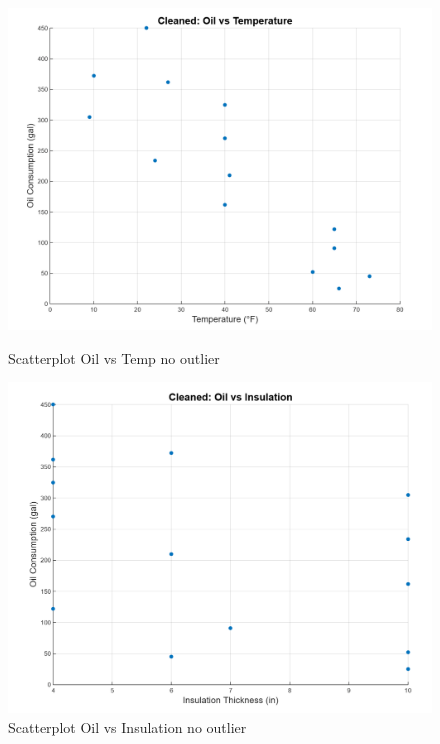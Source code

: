 \documentclass[12pt]{article}
\begin{document}
\begin{figure}[H]
    \centering
    \begin{minipage}{0.48\textwidth}
        \centering
        \includegraphics[width=\textwidth]{14.png}
        \caption{Scatterplot Oil vs Temp no outlier}
        \label{fig:oil_vs_temp}
    \end{minipage}
    \hfill %
    \begin{minipage}{0.48\textwidth}
        \centering
        \includegraphics[width=\textwidth]{15.png}
        \caption{Scatterplot Oil vs
Insulation no outlier}
        \label{fig:oil_vs_insulation}
    \end{minipage}
\end{figure}
\end{document}
